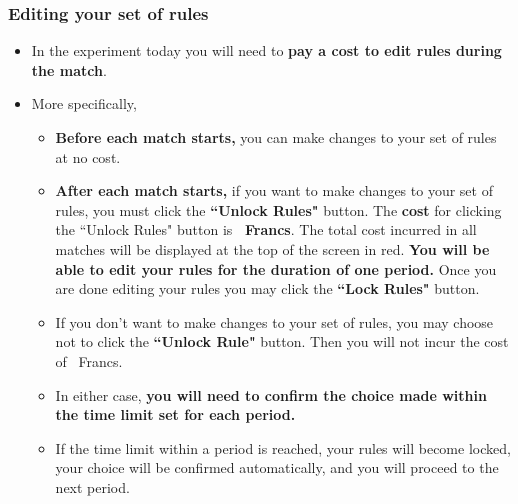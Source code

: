 \documentclass[11pt]{article}
\newcommand{\dblbkt}[1]{}
\begin{document}
\subsubsection*{\dblbkt{5}Editing your set of rules}
\begin{itemize} 
\item In the experiment today you will need to {\bf pay a cost to edit rules during the match}.  
\item More specifically, 
\begin{itemize} 
\item {\bf Before each match starts,} you can make changes to your set of rules at no cost.
\item {\bf After each match starts,} if you want to make changes to your set of rules, \dblbkt{1}you must click the {\bf ``Unlock Rules"} button. The {\bf cost} for clicking the ``Unlock Rules" button is {\bf \costAmount\ Francs}.  The total cost incurred in all matches\dblbkt{1} will be displayed at the top of the screen in red. {\bf You will be able to edit your rules for the duration of one period.} Once you are done editing your rules you may click the {\bf ``Lock Rules"} \dblbkt{1}button.  
\item If you don't want to make changes to your set of rules, you may choose not to click the {\bf ``Unlock Rule"} button. Then you will not incur the cost of \costAmount\ Francs. 
\item In either case, {\bf you will need to confirm the choice made within the time limit set for each period.} 
\item If the time limit within a period is reached, your rules will become locked, your choice will be confirmed automatically, and you will proceed to the next period.
\end{itemize} 
\end{itemize} 
\end{document}
